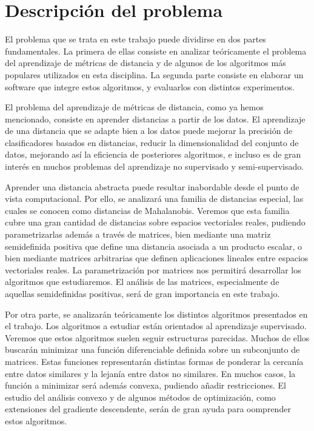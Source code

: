 \section{Descripción del problema}

El problema que se trata en este trabajo puede dividirse en dos partes fundamentales. La primera de ellas consiste en analizar teóricamente el problema del aprendizaje de métricas de distancia y de algunos de los algoritmos más populares utilizados en esta disciplina. La segunda parte consiste en elaborar un software que integre estos algoritmos, y evaluarlos con distintos experimentos.

El problema del aprendizaje de métricas de distancia, como ya hemos mencionado, consiste en aprender distancias a partir de los datos. El aprendizaje de una distancia que se adapte bien a los datos puede mejorar la precisión de clasificadores basados en distancias, reducir la dimensionalidad del conjunto de datos, mejorando así la eficiencia de posteriores algoritmos, e incluso es de gran interés en muchos problemas del aprendizaje no supervisado y semi-supervisado.

Aprender una distancia abstracta puede resultar inabordable desde el punto de vista computacional. Por ello, se analizará una familia de distancias especial, las cuales se conocen como distancias de Mahalanobis. Veremos que esta familia cubre una gran cantidad de distancias sobre espacios vectoriales reales, pudiendo parametrizarlas además a través de matrices, bien mediante una matriz semidefinida positiva que define una distancia asociada a un producto escalar, o bien mediante matrices arbitrarias que definen aplicaciones lineales entre espacios vectoriales reales. La parametrización por matrices nos permitirá desarrollar los algoritmos que estudiaremos. El análisis de las matrices, especialmente de aquellas semidefinidas positivas, será de gran importancia en este trabajo.

Por otra parte, se analizarán teóricamente los distintos algoritmos presentados en el trabajo. Los algoritmos a estudiar están orientados al aprendizaje supervisado. Veremos que estos algoritmos suelen seguir estructuras parecidas. Muchos de ellos buscarán minimizar una función diferenciable definida sobre un subconjunto de matrices. Estas funciones representarán distintas formas de ponderar la cercanía entre datos similares y la lejanía entre datos no similares. En muchos casos, la función a minimizar será además convexa, pudiendo añadir restricciones. El estudio del análisis convexo y de algunos métodos de optimización, como extensiones del gradiente descendente, serán de gran ayuda para oomprender estos algoritmos.

